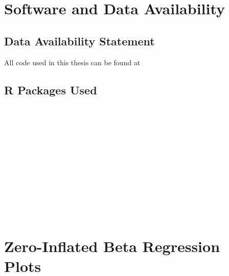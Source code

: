 \documentclass[12pt,twoside]{reedthesis}
\begin{document}
   	\appendix
   \chapter{Software and Data Availability}\label{chap:appR}
   
   \section{Data Availability Statement}
   
   All code used in this thesis can be found at 
     
     \section{R Packages Used}
	\begin{hangparas}{0.25in}{1}
	    \\
	   
	    \\
	   
	    \\
	   
	    \\
	   
	     \\ 
	   
	    \\
	   
	    \\
	   
	    \\
	   
	    \\
	   
	    \\
	   
	     \\ 
	   
   \end{hangparas}

    \chapter{Zero-Inflated Beta Regression Plots}\label{chap:appZOIB}
\end{document}
